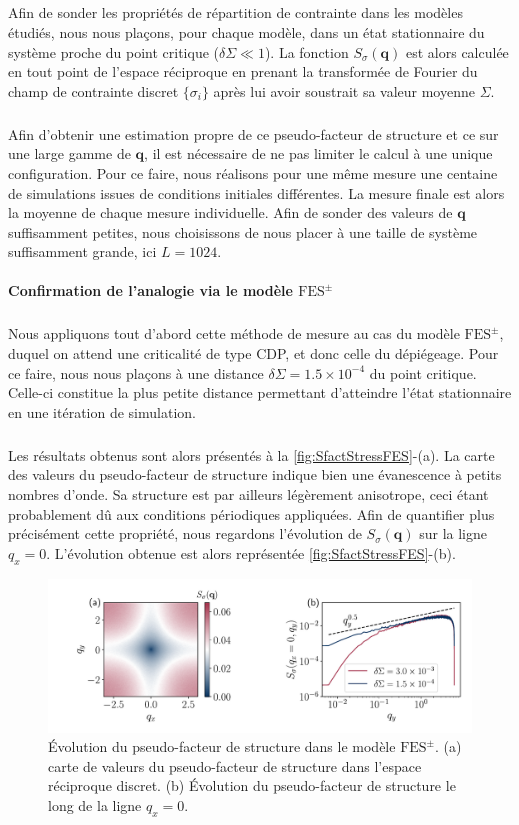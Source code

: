 \subparagraph{}Afin de sonder les propriétés de répartition de contrainte dans les modèles étudiés, nous nous plaçons, pour chaque modèle, dans un état stationnaire du système proche du point critique ($\delta\Sigma \ll 1$). La fonction $S_\sigma(\mathbf{q})$ est alors calculée en tout point de l'espace réciproque en prenant la transformée de Fourier du champ de contrainte discret $\{\sigma_i\}$ après lui avoir soustrait sa valeur moyenne $\Sigma$. 

\subparagraph{}Afin d'obtenir une estimation propre de ce pseudo-facteur de structure et ce sur une large gamme de $\mathbf{q}$, il est nécessaire de ne pas limiter le calcul à une unique configuration. Pour ce faire, nous réalisons pour une même mesure une centaine de simulations issues de conditions initiales différentes. La mesure finale est alors la moyenne de chaque mesure individuelle. Afin de sonder des valeurs de $\mathbf{q}$ suffisamment petites, nous choisissons de nous placer à une taille de système suffisamment grande, ici $L=1024$.

\paragraph{Confirmation de l'analogie via le modèle $\text{FES}^\pm$}

\subparagraph{}Nous appliquons tout d'abord cette méthode de mesure au cas du modèle $\text{FES}^\pm$, duquel on attend une criticalité de type CDP, et donc celle du dépiégeage. Pour ce faire, nous nous plaçons à une distance $\delta\Sigma = 1.5\times 10^{-4}$ du point critique. Celle-ci constitue la plus petite distance permettant d'atteindre l'état stationnaire en une itération de simulation.

\subparagraph{}Les résultats obtenus sont alors présentés à la \autoref{fig:SfactStressFES}-(a). La carte des valeurs du pseudo-facteur de structure indique bien une évanescence à petits nombres d'onde. Sa structure est par ailleurs légèrement anisotrope, ceci étant probablement dû aux conditions périodiques appliquées. Afin de quantifier plus précisément cette propriété, nous regardons l'évolution de $S_\sigma(\mathbf{q})$ sur la ligne $q_x = 0$. L'évolution obtenue est alors représentée \autoref{fig:SfactStressFES}-(b).

\begin{figure}[h]
	\centering	\includegraphics[width=\textwidth]{Chapitre4/Figures/Correlations/Sfact_SRPNC.pdf}
	\caption{Évolution du pseudo-facteur de structure dans le modèle $\text{FES}^\pm$. (a) carte de valeurs du pseudo-facteur de structure dans l'espace réciproque discret. (b) Évolution du pseudo-facteur de structure le long de la ligne $q_x=0$.}
	\label{fig:SfactStressFES}
\end{figure}

